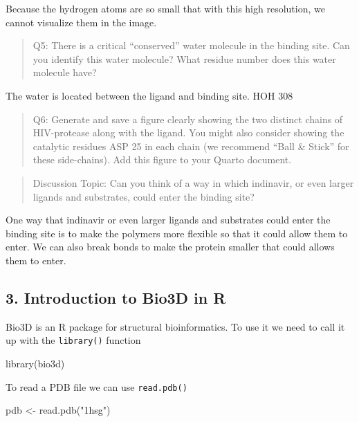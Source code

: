 \documentclass[
  letterpaper,
  DIV=11,
  numbers=noendperiod]{scrartcl}
\newenvironment{Shaded}{\begin{snugshade}}{\end{snugshade}}
\newcommand{\FunctionTok}[1]{\textcolor[rgb]{0.28,0.35,0.67}{#1}}
\newcommand{\NormalTok}[1]{\textcolor[rgb]{0.00,0.23,0.31}{#1}}
\newcommand{\OtherTok}[1]{\textcolor[rgb]{0.00,0.23,0.31}{#1}}
\newcommand{\StringTok}[1]{\textcolor[rgb]{0.13,0.47,0.30}{#1}}
\begin{document}
Because the hydrogen atoms are so small that with this high resolution,
we cannot visualize them in the image.

\begin{quote}
Q5: There is a critical ``conserved'' water molecule in the binding
site. Can you identify this water molecule? What residue number does
this water molecule have?
\end{quote}

The water is located between the ligand and binding site. HOH 308

\begin{quote}
Q6: Generate and save a figure clearly showing the two distinct chains
of HIV-protease along with the ligand. You might also consider showing
the catalytic residues ASP 25 in each chain (we recommend ``Ball \&
Stick'' for these side-chains). Add this figure to your Quarto document.
\end{quote}

\begin{quote}
Discussion Topic: Can you think of a way in which indinavir, or even
larger ligands and substrates, could enter the binding site?
\end{quote}

One way that indinavir or even larger ligands and substrates could enter
the binding site is to make the polymers more flexible so that it could
allow them to enter. We can also break bonds to make the protein smaller
that could allows them to enter.

\hypertarget{introduction-to-bio3d-in-r}{%
\subsection{3. Introduction to Bio3D in
R}\label{introduction-to-bio3d-in-r}}

Bio3D is an R package for structural bioinformatics. To use it we need
to call it up with the \texttt{library()} function

\begin{Shaded}
\begin{Highlighting}[]
\FunctionTok{library}\NormalTok{(bio3d)}
\end{Highlighting}
\end{Shaded}

To read a PDB file we can use \texttt{read.pdb()}

\begin{Shaded}
\begin{Highlighting}[]
\NormalTok{pdb }\OtherTok{\textless{}{-}} \FunctionTok{read.pdb}\NormalTok{(}\StringTok{"1hsg"}\NormalTok{)}
\end{Highlighting}
\end{Shaded}
\end{document}
